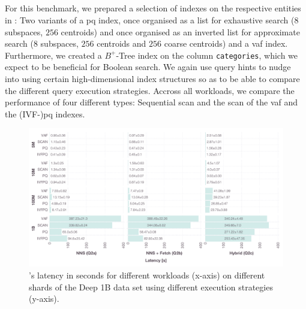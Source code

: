 \subsection{\cottontail}
\label{section:evaluation_bignns_cottontail}
For this benchmark, we prepared a selection of indexes on the respective entities in \cottontail{}: Two variants of a \acrshort{pq} index, once organised as a list for exhaustive search ($8$ subspaces, $256$ centroids) and once organised as an inverted list for approximate search ($8$ subspaces, $256$ centroids and $256$ coarse centroids) and a \acrshort{vaf} index. Furthermore, we created a $B^{+}$-Tree index on the column \texttt{categories}, which we expect to be beneficial for Boolean search. We again use query hints to nudge \cottontail{} into using certain high-dimensional index structures so as to be able to compare the different query execution strategies. Accross all workloads, we compare the performance of four different types: Sequential scan and the scan of the \acrshort{vaf} and the (IVF-)\acrshort{pq} indexes.

\begin{landscape}
    \begin{figure}[p]
        \centering
        \includegraphics[width=1.55\textwidth]{figures/bignns/cottontail/bignns-cottontail-runtime}
        \caption {\cottontail{}'s latency in seconds for different workloads (x-axis) on different shards of the Deep 1B data set using different execution strategies (y-axis).}
        \label{figure:cottontail_runtime}
    \end{figure}
\end{landscape}

